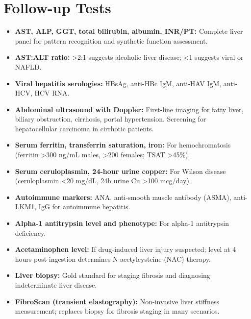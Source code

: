 \section*{Follow-up Tests}
\begin{itemize}
  \item \textbf{AST, ALP, GGT, total bilirubin, albumin, INR/PT:} Complete liver panel for pattern recognition and synthetic function assessment.
  \item \textbf{AST:ALT ratio:} >2:1 suggests alcoholic liver disease; <1 suggests viral or NAFLD.
  \item \textbf{Viral hepatitis serologies:} HBsAg, anti-HBc IgM, anti-HAV IgM, anti-HCV, HCV RNA.
  \item \textbf{Abdominal ultrasound with Doppler:} First-line imaging for fatty liver, biliary obstruction, cirrhosis, portal hypertension. Screening for hepatocellular carcinoma in cirrhotic patients.
  \item \textbf{Serum ferritin, transferrin saturation, iron:} For hemochromatosis (ferritin >300 ng/mL males, >200 females; TSAT >45\%).
  \item \textbf{Serum ceruloplasmin, 24-hour urine copper:} For Wilson disease (ceruloplasmin <20 mg/dL, 24h urine Cu >100 mcg/day).
  \item \textbf{Autoimmune markers:} ANA, anti-smooth muscle antibody (ASMA), anti-LKM1, IgG for autoimmune hepatitis.
  \item \textbf{Alpha-1 antitrypsin level and phenotype:} For alpha-1 antitrypsin deficiency.
  \item \textbf{Acetaminophen level:} If drug-induced liver injury suspected; level at 4 hours post-ingestion determines N-acetylcysteine (NAC) therapy.
  \item \textbf{Liver biopsy:} Gold standard for staging fibrosis and diagnosing indeterminate liver disease.
  \item \textbf{FibroScan (transient elastography):} Non-invasive liver stiffness measurement; replaces biopsy for fibrosis staging in many scenarios.
\end{itemize}

